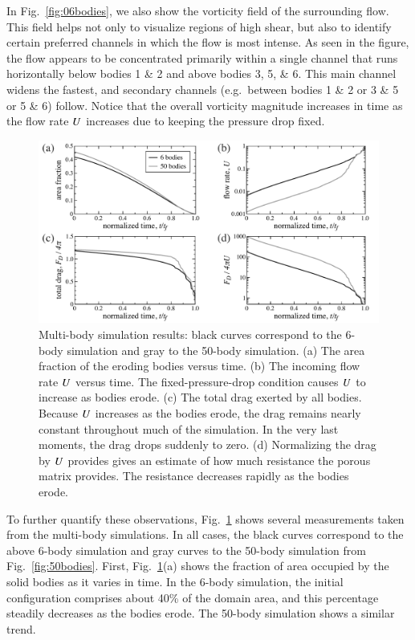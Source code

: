 \documentclass[preprint, 10pt]{elsarticle}
\begin{document}
In Fig.~\ref{fig:06bodies}, we also show the vorticity field of the surrounding flow. This field helps not only to visualize regions of high shear, but also to identify certain preferred channels in which the flow is most intense.
As seen in the figure, the flow appears to be concentrated primarily within a single channel that runs horizontally below bodies 1 \& 2 and above bodies 3, 5, \& 6. This main channel widens the fastest, and secondary channels (e.g.~between bodies 1 \& 2 or 3 \& 5 or 5 \& 6) follow. Notice that the overall vorticity magnitude increases in time as the flow rate $U$ increases due to keeping the pressure drop fixed.

\begin{figure}%
\begin{center}
\includegraphics[width = 0.90 \textwidth]{./figs/mbodyplots.pdf}
\caption{\label{fig:mbodyplots} 
Multi-body simulation results: black curves correspond to the 6-body simulation and gray to the 50-body simulation. (a) The area fraction of the eroding bodies versus time. (b) The incoming flow rate $U$ versus time. The fixed-pressure-drop condition causes $U$ to increase as bodies erode. (c) The total drag exerted by all bodies. Because $U$ increases as the bodies erode, the drag remains nearly constant throughout much of the simulation. In the very last moments, the drag drops suddenly to zero. (d) Normalizing the drag by $U$ provides gives an estimate of how much resistance the porous matrix provides. The resistance decreases rapidly as the bodies erode.
}
\end{center}
\end{figure}

To further quantify these observations, Fig.~\ref{fig:mbodyplots} shows
several measurements taken from the multi-body simulations. In all cases, the black curves correspond to the above 6-body simulation and gray curves to the 50-body simulation from Fig.~\ref{fig:50bodies}. First, Fig.~\ref{fig:mbodyplots}(a) shows the fraction of area occupied by the solid bodies as it varies in time. In the 6-body simulation, the initial configuration comprises about 40\% of the domain area, and this percentage steadily decreases as the bodies erode. The 50-body simulation shows a similar trend. 
\end{document}
